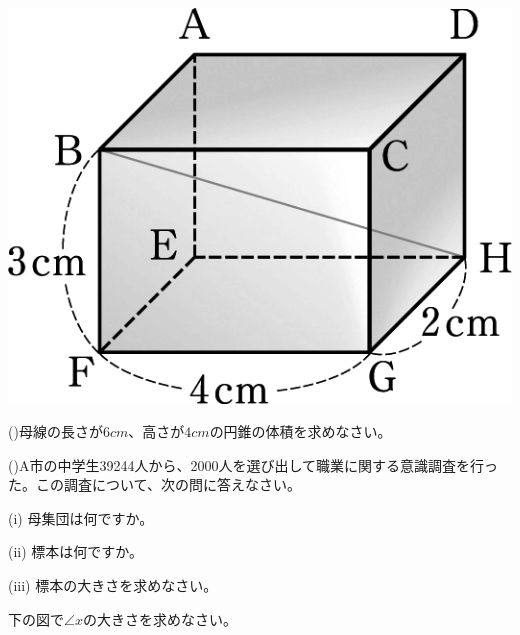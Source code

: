 \documentclass[
  12pt,a4paper,lualatex,ja=standard]{bxjsarticle}
\begin{document}
\begin{flushleft}
\begin{multicols}{2}
\columnbreak

\begin{center}
\def\@captype{figure}
\includegraphics{media/image103.png}

\end{center}

\end{multicols}

\vfill

()\hspace{2.5pt}母線の長さが$6 \si{cm}$、高さが$4 \si{cm}$の円錐の体積を求めなさい。

\vfill

()\hspace{2.5pt}A市の中学生39244人から、2000人を選び出して職業に関する意識調査を行った。この調査について、次の問に答えなさい。

\hspace{1em} (i) 母集団は何ですか。

\hspace{1em} (ii) 標本は何ですか。

\hspace{1em} (iii) 標本の大きさを求めなさい。

\vfill

\newpage

\setcounter{skaunta}{0}

\noindent{} \hspace{1pt}下の図で$\angle{x}$の大きさを求めなさい。


\end{flushleft}
\end{document}
